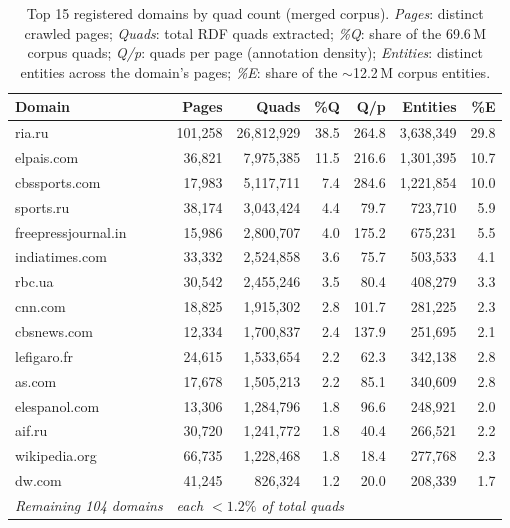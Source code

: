 \documentclass[11pt,a4paper]{article}
\begin{document}
\begin{table}[H]
\centering
\small
\setlength{\tabcolsep}{4pt}
\caption{Top 15 registered domains by quad count (merged corpus).
  \textit{Pages}: distinct crawled pages;
  \textit{Quads}: total RDF quads extracted;
  \textit{\%Q}: share of the 69.6\,M corpus quads;
  \textit{Q/p}: quads per page (annotation density);
  \textit{Entities}: distinct entities across the domain's pages;
  \textit{\%E}: share of the ${\sim}$12.2\,M corpus entities.}

\label{tab:domain_coverage}
\begin{tabular}{lrrrrrr}
\toprule
\textbf{Domain} & \textbf{Pages} & \textbf{Quads} & \textbf{\%Q} & \textbf{Q/p} & \textbf{Entities} & \textbf{\%E} \\
\midrule
ria.ru              & 101{,}258 & 26{,}812{,}929 & 38.5 & 264.8 & 3{,}638{,}349 & 29.8 \\
elpais.com          &  36{,}821 &  7{,}975{,}385 & 11.5 & 216.6 & 1{,}301{,}395 & 10.7 \\
cbssports.com       &  17{,}983 &  5{,}117{,}711 &  7.4 & 284.6 & 1{,}221{,}854 & 10.0 \\
sports.ru           &  38{,}174 &  3{,}043{,}424 &  4.4 &  79.7 &   723{,}710   &  5.9 \\
freepressjournal.in &  15{,}986 &  2{,}800{,}707 &  4.0 & 175.2 &   675{,}231   &  5.5 \\
indiatimes.com      &  33{,}332 &  2{,}524{,}858 &  3.6 &  75.7 &   503{,}533   &  4.1 \\
rbc.ua              &  30{,}542 &  2{,}455{,}246 &  3.5 &  80.4 &   408{,}279   &  3.3 \\
cnn.com             &  18{,}825 &  1{,}915{,}302 &  2.8 & 101.7 &   281{,}225   &  2.3 \\
cbsnews.com         &  12{,}334 &  1{,}700{,}837 &  2.4 & 137.9 &   251{,}695   &  2.1 \\
lefigaro.fr         &  24{,}615 &  1{,}533{,}654 &  2.2 &  62.3 &   342{,}138   &  2.8 \\
as.com              &  17{,}678 &  1{,}505{,}213 &  2.2 &  85.1 &   340{,}609   &  2.8 \\
elespanol.com       &  13{,}306 &  1{,}284{,}796 &  1.8 &  96.6 &   248{,}921   &  2.0 \\
aif.ru              &  30{,}720 &  1{,}241{,}772 &  1.8 &  40.4 &   266{,}521   &  2.2 \\
wikipedia.org       &  66{,}735 &  1{,}228{,}468 &  1.8 &  18.4 &   277{,}768   &  2.3 \\
dw.com              &  41{,}245 &    826{,}324   &  1.2 &  20.0 &   208{,}339   &  1.7 \\
\midrule
\textit{Remaining 104 domains} & \multicolumn{5}{l}{\textit{each ${<}1.2\%$ of total quads}} & \\
\bottomrule
\end{tabular}
\end{table}
\end{document}
